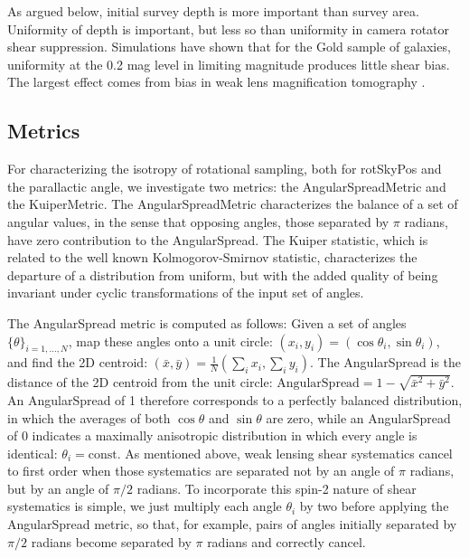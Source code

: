 As argued below, initial survey depth is more important than survey area.
Uniformity of depth is important, but less so than uniformity in camera rotator
shear suppression.  Simulations have shown that for the Gold sample of galaxies,
uniformity at the 0.2 mag level in limiting magnitude produces little shear
bias. The largest effect comes from bias in weak lens magnification tomography
\citet{Morrison2012}.


\subsection{Metrics}

For characterizing the isotropy of rotational sampling, both for rotSkyPos and
the parallactic angle, we investigate two metrics: the AngularSpreadMetric and
the KuiperMetric.  The AngularSpreadMetric characterizes the balance of a set of
angular values, in the sense that opposing angles, those separated by $\pi$
radians, have zero contribution to the AngularSpread.  The Kuiper statistic,
which is related to the well known Kolmogorov-Smirnov statistic, characterizes
the departure of a distribution from uniform, but with the added quality of
being invariant under cyclic transformations of the input set of angles.

The AngularSpread metric is computed as follows:  Given a set of angles
$\{\theta\}_{i=1, ..., N}$, map these angles onto a unit circle: $(x_i, y_i) =
(\cos \theta_i, \sin \theta_i)$, and find the 2D centroid: $(\bar{x}, \bar{y}) =
\frac{1}{N} (\sum_i x_i, \sum_i y_i)$.  The AngularSpread is the distance of the
2D centroid from the unit circle: $\mathrm{AngularSpread} = 1 - \sqrt{\bar{x}^2 +
\bar{y}^2}$.  An AngularSpread of 1 therefore corresponds to a perfectly
balanced distribution, in which the averages of both $\cos \theta$ and $\sin
\theta$ are zero, while an AngularSpread of 0 indicates a maximally anisotropic
distribution in which every angle is identical: $\theta_i = \mathrm{const}$.  As
mentioned above, weak lensing shear systematics cancel to first order when those
systematics are separated not by an angle of $\pi$ radians, but by an angle of
$\pi/2$ radians.  To incorporate this spin-2 nature of shear systematics is
simple, we just multiply each angle $\theta_i$ by two before applying the
AngularSpread metric, so that, for example, pairs of angles initially separated
by $\pi/2$ radians become separated by $\pi$ radians and correctly cancel.

